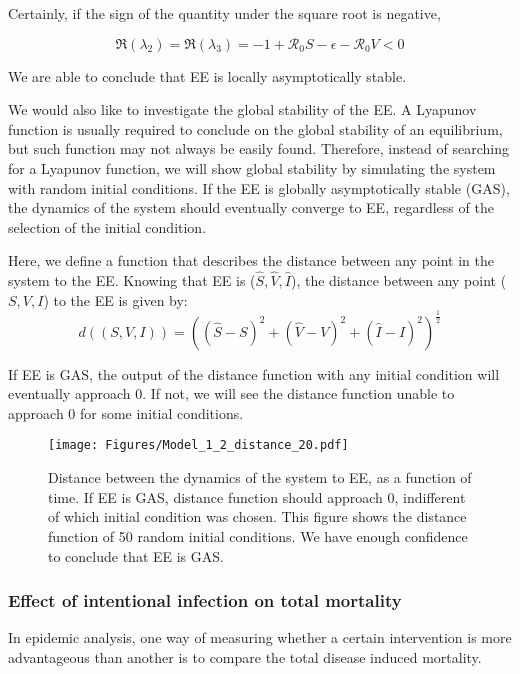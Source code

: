 \documentclass[12pt]{article}
\newcommand{\R}{\mathcal{R}}
\begin{document}
Certainly, if the sign of the quantity under the square root is negative,
\begin{linenomath*}
\begin{equation}
\Re(\lambda_2)=\Re(\lambda_3)=-1+\R_0 S-\epsilon-\R_0 V<0
\end{equation}
\end{linenomath*}

We are able to conclude that EE is locally asymptotically stable.

We would also like to investigate the global stability of the EE. A Lyapunov function is usually required to conclude on the global stability of an equilibrium, but such function may not always be easily found. Therefore, instead of searching for a Lyapunov function, we will show global stability by simulating the system with random initial conditions. If the EE is globally asymptotically stable (GAS), the dynamics of the system should eventually converge to EE, regardless of the selection of the initial condition.

Here, we define a function that describes the distance between any point in the system to the EE. Knowing that EE is ($\hat{S}, \hat{V},\hat{I}$), the distance between any point ($S,V,I$) to the EE is given by:
\begin{equation}
d((S,V,I))=((\hat{S}-S)^2+(\hat{V}-V)^2+(\hat{I}-I)^2)^{\frac{1}{2}}
\end{equation}

If EE is GAS, the output of the distance function with any initial condition will eventually approach 0. If not, we will see the distance function unable to approach 0 for some initial conditions.

\begin{figure}[H]
  \centering
  \texttt{[image: Figures/Model\_1\_2\_distance\_20.pdf]}
  \caption{Distance between the dynamics of the system to EE, as a function of time. If EE is GAS, distance function should approach 0, indifferent of which initial condition was chosen. This figure shows the distance function of 50 random initial conditions. We have enough confidence to conclude that EE is GAS.}
\end{figure}

\subsubsection{Effect of intentional infection on total mortality}\label{section2.2.3}

In epidemic analysis, one way of measuring whether a certain intervention is more advantageous than another is to compare the total disease induced mortality. 
\end{document}
